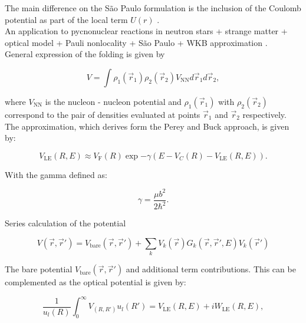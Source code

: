 \documentclass[openany]{book}
\begin{document}
The main difference on the São Paulo formulation is the inclusion of the Coulomb potential as part of the local term $U(r)$ . \\

An application to pycnonuclear reactions in neutron stars + strange matter + optical model + Pauli nonlocality + São Paulo  + WKB approximation \cite{golf_hellmers_weber_2009}.\\ 


General expression of the folding is given by

\begin{equation}\label{potential_nonLocal_folding}
	V = \int \rho_1(\vec r_1) \rho_2(\vec r_2) V_\mathrm{NN} d\vec r_1 d\vec r_2,
\end{equation}

where $V_\mathrm{NN}$ is the nucleon - nucleon potential and $\rho_1(\vec r_1)$ with  $\rho_2(\vec r_2)$ correspond to the pair of densities evaluated at points $\vec r_1$ and $\vec r_2$ respectively. \\

The approximation, which derives form the Perey and Buck approach, is given by: 

\begin{equation}\label{potential_nonLocal_LE}
	V_\mathrm{LE}(R, E) \approx V_\mathrm{F}(R) \exp {-\gamma (E - V_C(R) -V_\mathrm{LE}(R, E))}.
\end{equation}

With the gamma defined as:

\begin{equation}\label{potential_nonLocal_b}
	\gamma = \frac{\mu b^2}{2\hbar^2}.
\end{equation}

Series calculation of the potential

\begin{equation}\label{potential_nonLocal_seriesV}
	V(\vec r, \vec r') = V_{\mathrm{bare}}(\vec r, \vec r') + \sum_k{V_k(\vec r)G_k (\vec r, \vec r', E)V_k(\vec r') }
\end{equation}

The bare potential $V_{\mathrm{bare}}(\vec r, \vec r') $ and additional term contributions.  This can be complemented as the optical potential is given by:


\begin{equation}\label{potential_nonLocal_optical}
	\frac{1}{u_l(R)} 	\int_{0}^{\infty} {V_(R, R') u_l(R')} = V_\mathrm{LE}(R, E) + i W_\mathrm{LE}(R, E), 
\end{equation}
\end{document}
